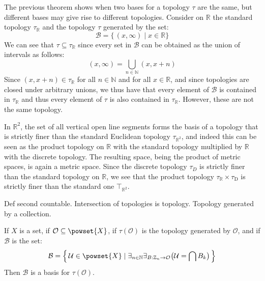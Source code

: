 \documentclass{book}                                                           %
\begin{document}
            \begin{example}
                The previous theorem shows when two bases for a topology $\tau$ are
                the same, but different bases may give rise to different topologies.
                Consider on $\mathbb{R}$ the standard topology $\tau_{\mathbb{R}}$
                and the topology $\tau$ generated by the set:
                \begin{equation}
                    \mathcal{B}=\{\,(x,\infty)\;|\;x\in\mathbb{R}\}
                \end{equation}
                We can see that $\tau\subseteq\tau_{\mathbb{R}}$ since every set
                in $\mathcal{B}$ can be obtained as the union of intervals as
                follows:
                \begin{equation}
                    (x,\infty)=\bigcup_{n\in\mathbb{N}}(x,x+n)
                \end{equation}
                Since $(x,x+n)\in\tau_{\mathbb{R}}$ for all $n\in\mathbb{N}$ and for
                all $x\in\mathbb{R}$, and since topologies are closed under
                arbitrary unions, we thus have that every element of $\mathcal{B}$
                is contained in $\tau_{\mathbb{R}}$ and thus every element of
                $\tau$ is also contained in $\tau_{\mathbb{R}}$. However, these are
                not the same topology.
            \end{example}
            \begin{example}
                In $\mathbb{R}^{2}$, the set of all vertical open line segments
                forms the basis of a topology that is strictly finer than the
                standard Euclidean topology $\tau_{\mathbb{R}^{2}}$, and indeed this
                can be seen as the product topology on $\mathbb{R}$ with the
                standard topology multiplied by $\mathbb{R}$ with the discrete
                topology. The resulting space, being the product of metric spaces,
                is again a metric space. Since the discrete topology $\tau_{D}$ is
                strictly finer than the standard topology on $\mathbb{R}$, we see
                that the product topology $\tau_{\mathbb{R}}\times\tau_{\mathrm{D}}$
                is strictly finer than the standard one $\top_{\mathbb{R}^{2}}$.
            \end{example}
            Def second countable. Intersection of topologies is topology. Topology
            generated by a collection.
            \begin{theorem}
                If $X$ is a set, if $\mathcal{O}\subseteq\powset{X}$, if
                $\tau(\mathcal{O})$ is the topology generated by $\mathcal{O}$,
                and if $\mathcal{B}$ is the set:
                \begin{equation}
                    \mathcal{B}=\Big\{\,\mathcal{U}\in\powset{X}\;|\;
                        \exists_{n\in\mathbb{N}}
                        \exists_{B:\mathbb{Z}_{n}\rightarrow\mathcal{O}}
                        \big(\mathcal{U}=\bigcap{B}_{k}\big)\,\Big\}
                \end{equation}
                Then $\mathcal{B}$ is a basis for $\tau(\mathcal{O})$.
            \end{theorem}
\end{document}
